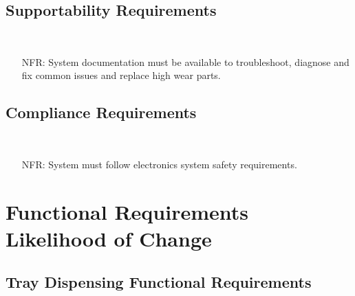 \documentclass[12pt]{article}
\newcounter{nfrnum} %
\begin{document}
  \subsection{Supportability Requirements }\
  \noindent \begin{itemize}
  \item[NFR\refstepcounter{nfrnum}\thenfrnum \label{NFR_Portability17}:]
  System documentation must be available to troubleshoot, diagnose and fix common issues and replace high wear parts.
  \end{itemize}

  \subsection{Compliance Requirements }\
  \noindent \begin{itemize}
  \item[NFR\refstepcounter{nfrnum}\thenfrnum \label{NFR_Portability18}:]
  System must follow electronics system safety requirements.
  \end{itemize}
  

\section{Functional Requirements Likelihood of Change}

\subsection{Tray Dispensing Functional Requirements}
\end{document}
